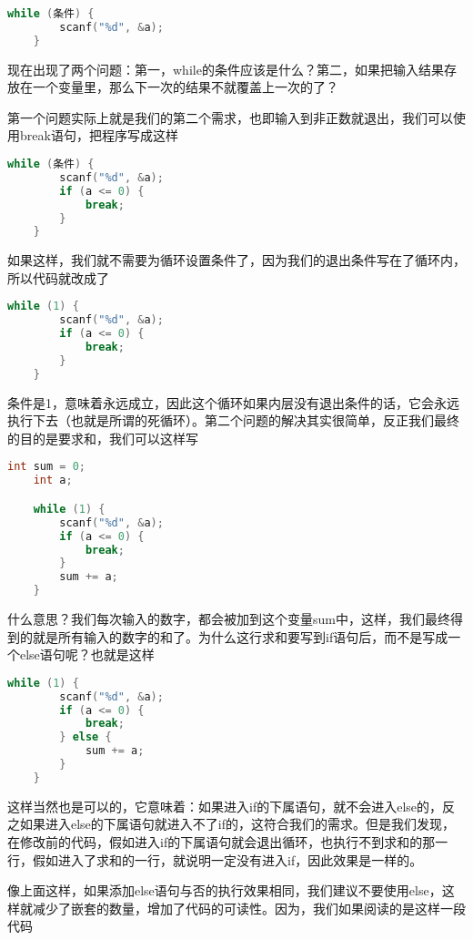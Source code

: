 \begin{lstlisting}[language=C]
    while (条件) {
        scanf("%d", &a);
    }
\end{lstlisting}

现在出现了两个问题：第一，while的条件应该是什么？第二，如果把输入结果存放在一个变量里，那么下一次的结果不就覆盖上一次的了？

第一个问题实际上就是我们的第二个需求，也即输入到非正数就退出，我们可以使用break语句，把程序写成这样

\begin{lstlisting}[language=C]
    while (条件) {
        scanf("%d", &a);
        if (a <= 0) {
            break;
        }
    }
\end{lstlisting}

如果这样，我们就不需要为循环设置条件了，因为我们的退出条件写在了循环内，所以代码就改成了

\begin{lstlisting}[language=C]
    while (1) {
        scanf("%d", &a);
        if (a <= 0) {
            break;
        }
    }
\end{lstlisting}

条件是1，意味着永远成立，因此这个循环如果内层没有退出条件的话，它会永远执行下去（也就是所谓的死循环）。第二个问题的解决其实很简单，反正我们最终的目的是要求和，我们可以这样写

\begin{lstlisting}[language=C]
    int sum = 0;
    int a;

    while (1) {
        scanf("%d", &a);
        if (a <= 0) {
            break;
        }
        sum += a;
    }
\end{lstlisting}

什么意思？我们每次输入的数字，都会被加到这个变量sum中，这样，我们最终得到的就是所有输入的数字的和了。为什么这行求和要写到if语句后，而不是写成一个else语句呢？也就是这样

\begin{lstlisting}[language=C]
    while (1) {
        scanf("%d", &a);
        if (a <= 0) {
            break;
        } else {
            sum += a;
        }
    }
\end{lstlisting}

这样当然也是可以的，它意味着：如果进入if的下属语句，就不会进入else的，反之如果进入else的下属语句就进入不了if的，这符合我们的需求。但是我们发现，在修改前的代码，假如进入if的下属语句就会退出循环，也执行不到求和的那一行，假如进入了求和的一行，就说明一定没有进入if，因此效果是一样的。

像上面这样，如果添加else语句与否的执行效果相同，我们建议不要使用else，这样就减少了嵌套的数量，增加了代码的可读性。因为，我们如果阅读的是这样一段代码

